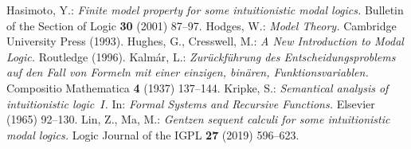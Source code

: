 \documentclass[draft]{article}
\begin{document}
\begin{thebibliography}{}
%
%
Hasimoto, Y.:
{\it Finite model property for some intuitionistic modal logics.}
Bulletin of the Section of Logic {\bf 30} (2001) 87--97.
%
%
Hodges, W.:
{\it Model Theory.}
Cambridge University Press (1993).
%
%
Hughes, G., Cresswell, M.:
{\it A New Introduction to Modal Logic.}
Routledge (1996).
%
%
%
%
%
%
Kalm\'ar, L.:
{\it Zur\"uckf\"uhrung des Entscheidungsproblems auf den Fall von Formeln mit einer einzigen, bin\"aren, Funktionsvariablen.}
Compositio Mathematica {\bf 4} (1937) 137--144.
%
%
%
%
%
%
%
%
%
%
Kripke, S.:
{\it Semantical analysis of intuitionistic logic~$I$.}
In: {\it Formal Systems and Recursive Functions.}
Elsevier (1965) 92--130.
%
%
%
%
%
%
Lin, Z., Ma, M.:
{\it Gentzen sequent calculi for some intuitionistic modal logics.}
Logic Journal of the IGPL {\bf 27} (2019) 596--623.
%
%
%
%

\end{thebibliography}
\end{document}
